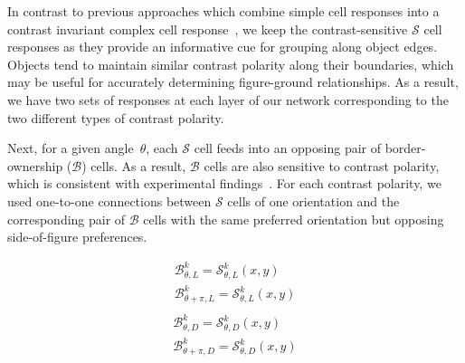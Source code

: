\documentclass[12pt]{article}
\begin{document}
In contrast to previous approaches which combine simple cell responses into a contrast invariant complex cell response~\citep{Russell_etal14}, we keep the contrast-sensitive
$\mathcal{S}$
cell responses as they provide an informative cue for grouping along object edges. Objects tend to maintain similar contrast polarity along their boundaries, which may be useful for accurately determining figure-ground relationships. As a result, we have two sets of responses at each layer of our network corresponding to the two different types of contrast polarity.

Next, for a given angle~$\theta$, each 
$\mathcal{S}$
cell
 feeds into an opposing pair of border-ownership ($\mathcal{B}$) cells.
As a result, 
$\mathcal{B}$
cells are also sensitive to contrast polarity, which is consistent with experimental findings~\citep{Zhou_etal00}.
For each contrast polarity, we used one-to-one connections between 
$\mathcal{S}$
cells of one orientation and the corresponding pair of
$\mathcal{B}$
cells with the same preferred orientation but opposing side-of-figure preferences. %

\begin{equation}
\begin{split}
\mathcal{B}^k_{\theta,L} = \mathcal{S}^k_{\theta,L}(x,y)\\
\mathcal{B}^k_{\theta+\pi,L} = \mathcal{S}^k_{\theta,L}(x,y)\\
\end{split}
\end{equation}
\begin{equation}
\begin{split}
\mathcal{B}^k_{\theta,D} = \mathcal{S}^k_{\theta,D}(x,y)\\
\mathcal{B}^k_{\theta+\pi,D} = \mathcal{S}^k_{\theta,D}(x,y)
\end{split}
\end{equation}
\end{document}
